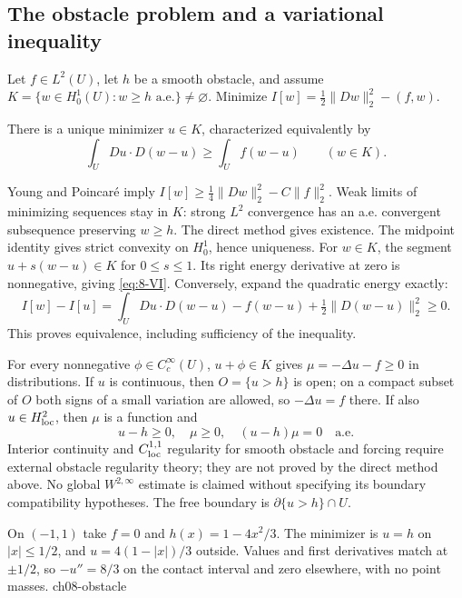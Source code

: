 \subsection{The obstacle problem and a variational inequality}
Let $f\in L^2(U)$, let $h$ be a smooth obstacle, and assume
$K=\{w\in H^1_0(U):w\geq h\text{ a.e.}\}\ne\varnothing$.
Minimize $I[w]=\frac12\|Dw\|_2^2-(f,w)$.
\Needspace{55mm}
\begin{theorem}
There is a unique minimizer $u\in K$, characterized equivalently by
\begin{equation}\label{eq:8-VI}
 \int_U Du\cdot D(w-u)\geq\int_Uf(w-u)\qquad(w\in K).
\end{equation}
\end{theorem}
\begin{expandedproof}
Young and Poincar\'e imply
$I[w]\geq\frac14\|Dw\|_2^2-C\|f\|_2^2$.
Weak limits of minimizing sequences stay in $K$: strong $L^2$ convergence
has an a.e. convergent subsequence preserving $w\geq h$.
The direct method gives existence. The midpoint identity gives strict
convexity on $H^1_0$, hence uniqueness.
For $w\in K$, the segment $u+s(w-u)\in K$ for $0\leq s\leq1$.
Its right energy derivative at zero is nonnegative, giving \eqref{eq:8-VI}.
Conversely, expand the quadratic energy exactly:
\[
 I[w]-I[u]=\int_U Du\cdot D(w-u)-f(w-u)
                    +\tfrac12\|D(w-u)\|_2^2\geq0.
\]
This proves equivalence, including sufficiency of the inequality.
\end{expandedproof}
For every nonnegative $\phi\in C_c^\infty(U)$, $u+\phi\in K$ gives
$\mu=-\Delta u-f\geq0$ in distributions. If $u$ is continuous, then
$O=\{u>h\}$ is open; on a compact subset of $O$ both signs of a small
variation are allowed, so $-\Delta u=f$ there. If also $u\in H^2_{\rm loc}$,
then $\mu$ is a function and
\[
 u-h\geq0,\quad\mu\geq0,\quad (u-h)\mu=0\quad\text{a.e.}
\]
Interior continuity and $C^{1,1}_{\rm loc}$ regularity for smooth obstacle
and forcing require external obstacle regularity theory; they are not
proved by the direct method above. No global $W^{2,\infty}$ estimate
is claimed without specifying its boundary compatibility hypotheses.
The free boundary is $\partial\{u>h\}\cap U$.
\Needspace{55mm}

{On $(-1,1)$ take $f=0$ and $h(x)=1-4x^2/3$. The minimizer is $u=h$ on $|x|\leq1/2$, and $u=4(1-|x|)/3$ outside. Values and first derivatives match at $\pm1/2$, so $-u''=8/3$ on the contact interval and zero elsewhere, with no point masses.}
{ch08-obstacle}

